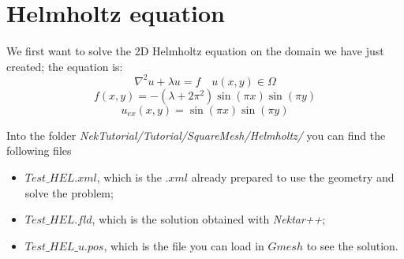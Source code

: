 \documentclass[12pt]{article}
\begin{document}
\section{Helmholtz equation}

We first want to solve the 2D Helmholtz equation on the domain we have just created; the equation is:
\begin{equation}
\nabla^2 u + \lambda u = f \quad u(x,y) \in \Omega
 \end{equation}
 \begin{equation}
f(x,y)= -(\lambda + 2\pi^2)\sin(\pi x)\sin(\pi y)
 \end{equation}
\begin{equation}
u_{ex}(x,y)= \sin(\pi x)\sin(\pi y)
 \end{equation}
 
 \noindent
 Into the folder \emph{NekTutorial/Tutorial/SquareMesh/Helmholtz/} you can find the following files
 \begin{itemize}
 \item $Test\_HEL.xml$, which is the $.xml$ already prepared to use the geometry and solve the problem;
 \item $Test\_HEL.fld$, which is the solution obtained with \emph{Nektar++};
 \item $Test\_HEL\_u.pos$, which is the file you can load in $Gmesh$ to see the solution.
 \end{itemize} 
\end{document}

